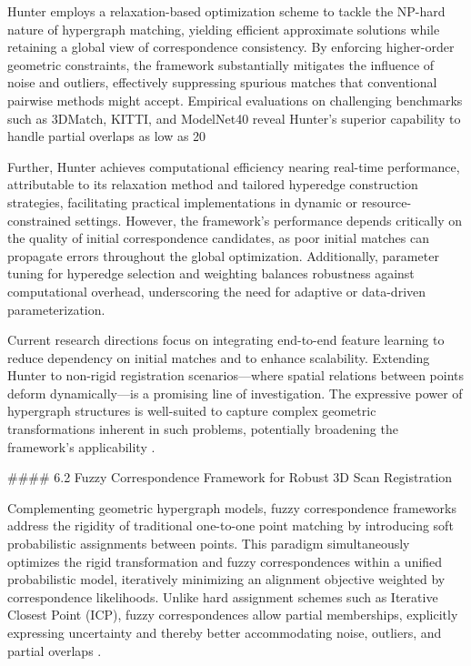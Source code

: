 \documentclass[11pt]{article}
\begin{document}
Hunter employs a relaxation-based optimization scheme to tackle the NP-hard nature of hypergraph matching, yielding efficient approximate solutions while retaining a global view of correspondence consistency. By enforcing higher-order geometric constraints, the framework substantially mitigates the influence of noise and outliers, effectively suppressing spurious matches that conventional pairwise methods might accept. Empirical evaluations on challenging benchmarks such as 3DMatch, KITTI, and ModelNet40 reveal Hunter’s superior capability to handle partial overlaps as low as 20%

Further, Hunter achieves computational efficiency nearing real-time performance, attributable to its relaxation method and tailored hyperedge construction strategies, facilitating practical implementations in dynamic or resource-constrained settings. However, the framework’s performance depends critically on the quality of initial correspondence candidates, as poor initial matches can propagate errors throughout the global optimization. Additionally, parameter tuning for hyperedge selection and weighting balances robustness against computational overhead, underscoring the need for adaptive or data-driven parameterization.

Current research directions focus on integrating end-to-end feature learning to reduce dependency on initial matches and to enhance scalability. Extending Hunter to non-rigid registration scenarios—where spatial relations between points deform dynamically—is a promising line of investigation. The expressive power of hypergraph structures is well-suited to capture complex geometric transformations inherent in such problems, potentially broadening the framework’s applicability \cite{ref6}.

#### 6.2 Fuzzy Correspondence Framework for Robust 3D Scan Registration

Complementing geometric hypergraph models, fuzzy correspondence frameworks address the rigidity of traditional one-to-one point matching by introducing soft probabilistic assignments between points. This paradigm simultaneously optimizes the rigid transformation and fuzzy correspondences within a unified probabilistic model, iteratively minimizing an alignment objective weighted by correspondence likelihoods. Unlike hard assignment schemes such as Iterative Closest Point (ICP), fuzzy correspondences allow partial memberships, explicitly expressing uncertainty and thereby better accommodating noise, outliers, and partial overlaps \cite{ref5}.
\end{document}
